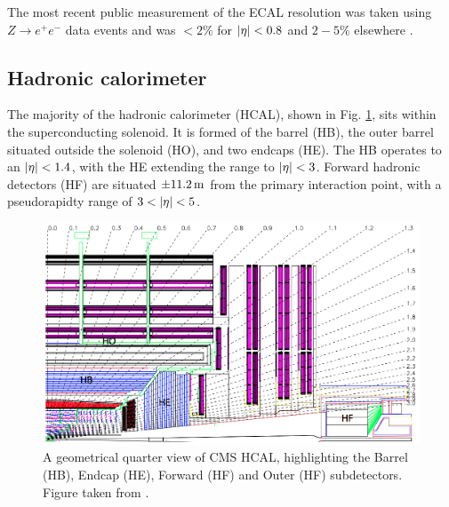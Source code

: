 The most recent public measurement of the ECAL resolution was taken using $Z\rightarrow e^{+}e^{-}$ data events and was $<2\%$ for $\lvert \eta \rvert<0.8$ and  $2-5\%$ elsewhere \cite{CMSECALRESMEAS}.



\subsection{Hadronic calorimeter}
\label{ssec:HCAL}

The majority of the hadronic calorimeter (HCAL), shown in Fig. \ref{fig:CMSHCAL}, sits within the superconducting solenoid. 
It is formed of the barrel (HB), the outer barrel situated outside the solenoid (HO), and two endcaps (HE). 
The HB operates to an $\lvert \eta \rvert<1.4$, with the HE extending the range to $\lvert \eta \rvert<3$.
Forward hadronic detectors (HF) are situated $\pm11.2\,\text{m}$ from the primary interaction point, with a pseudorapidty range of $3<\lvert \eta \rvert<5$.
\begin{figure}[htpb]
	\centering
	\includegraphics[width=\textwidth]{Figures/CMSHCAL}
	\caption[A geometrical quarter view of CMS HCAL, highlighting the Barrel (HB), Endcap (HE), Forward (HF) and Outer (HF) subdetectors.]{A geometrical quarter view of CMS HCAL, highlighting the Barrel (HB), Endcap (HE), Forward (HF) and Outer (HF) subdetectors. Figure taken from \cite{CMSExperiment}.}
	\label{fig:CMSHCAL}
\end{figure}

